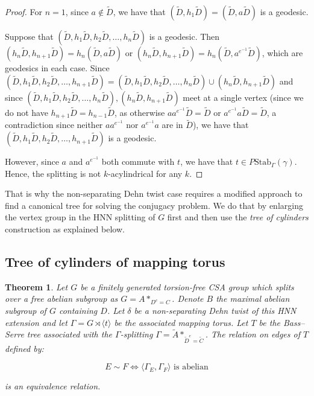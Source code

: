 \documentclass{amsart}
\theoremstyle{plain}
\newtheorem{thm}{Theorem}[section]
\theoremstyle{definition}
\theoremstyle{remark}
\begin{document}
\begin{proof}
    For $n=1$, since $a \notin \tilde{D}$, we have that $(\tilde{D}, h_1\tilde{D}) = (\tilde{D}, a\tilde{D})$ is a geodesic. 

    Suppose that $(\tilde{D}, h_1 \tilde{D}, h_2 \tilde{D}, \ldots, h_n \tilde{D})$ is a geodesic. Then $(h_n \tilde{D}, h_{n+1} \tilde{D}) = h_n(\tilde{D}, a\tilde{D})$ or $(h_n \tilde{D}, h_{n+1} \tilde{D}) = h_n(\tilde{D}, a^{e^{-1}}\tilde{D})$, which are geodesics in each case. Since $(\tilde{D}, h_1 \tilde{D}, h_2 \tilde{D}, \ldots, h_{n+1} \tilde{D}) = (\tilde{D}, h_1 \tilde{D}, h_2 \tilde{D}, \ldots, h_n \tilde{D}) \cup (h_n \tilde{D}, h_{n+1}\tilde{D})$ and since $(\tilde{D}, h_1 \tilde{D}, h_2 \tilde{D}, \ldots, h_n \tilde{D}), (h_n \tilde{D}, h_{n+1}\tilde{D})$ meet at a single vertex (since we do not have $h_{n+1}\tilde{D} = h_{n-1} \tilde{D}$, as otherwise $a a^{e^{-1}}\tilde{D} = \tilde{D}$ or $a^{e^{-1}} a \tilde{D} = \tilde{D}$, a contradiction since neither $aa^{e^{-1}}$ nor $a^{e^{-1}}a$ are in $\tilde{D}$), we have that $(\tilde{D}, h_1 \tilde{D}, h_2 \tilde{D}, \ldots, h_{n+1} \tilde{D})$ is a geodesic. 

    However, since $a$ and $a^{e^{-1}}$ both commute with $t$, we have that $t \in P\mathrm{Stab}_{\Gamma}(\gamma)$. Hence, the splitting is not $k$-acylindrical for any $k$. 
\end{proof}

That is why the non-separating Dehn twist case requires a modified approach to find a canonical tree for solving the conjugacy problem. We do that by enlarging the vertex group in the HNN splitting of $G$ first and then use the \textit{tree of cylinders} construction as explained below.

\subsection{Tree of cylinders of mapping torus}

\begin{thm}
    \label{thm: Tree of cylinders of mapping torus}
    Let $G$ be a finitely generated torsion-free CSA group which splits over a free abelian subgroup as $G = A*_{D^e=C}$. Denote $B$ the maximal abelian subgroup of $G$ containing $D$. Let $\delta$ be a non-separating Dehn twist of this HNN extension and let $\Gamma = G \rtimes \langle t \rangle$ be the associated mapping torus. Let $T$ be the Bass--Serre tree associated with the $\Gamma$-splitting $\Gamma = \tilde{A}*_{\tilde{D}^e=\tilde{C}}$. The relation on edges of $T$ defined by: 
    
    $$E \sim F \iff \langle \Gamma_E, \Gamma_F \rangle \text{ is abelian}$$

    is an equivalence relation. 
\end{thm}
\end{document}
